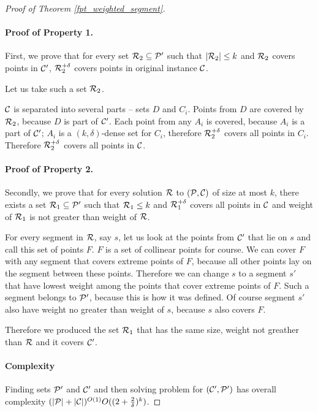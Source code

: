 \begin{proof}[Proof of Theorem \ref{fpt_weighted_segment}]
\paragraph{Proof of Property 1.}
First, we prove that
for every set $\mathcal{R}_2 \subseteq \mathcal{P}'$ such that $|\mathcal{R}_2| \le k$
and $\mathcal{R}_2$ covers points in $\mathcal{C}'$, $\mathcal{R}_2^{+\delta}$
covers points in original instance $\mathcal{C}$.

Let us take such a set $\mathcal{R}_2$.

$\mathcal{C}$ is separated into several parts -- sets $D$ and $C_i$.
Points from $D$ are covered by $\mathcal{R}_2$, because $D$ is part of $\mathcal{C}'$.
Each point from any $A_i$ is covered, because $A_i$ is a part of $\mathcal{C}'$;
$A_i$ is a $(k,\delta)$-dense set for $C_i$, therefore $\mathcal{R}_2^{+\delta}$
covers all points in $C_i$. Therefore $\mathcal{R}_2^{+\delta}$ covers
all points in $\mathcal{C}$.

\paragraph{Proof of Property 2.}
Secondly, we prove that for every solution
$\mathcal{R}$ to $(\mathcal{P}, \mathcal{C})$ of size at most $k$,
there exists a set $\mathcal{R}_1 \subseteq \mathcal{P}'$ such that
$\mathcal{R}_1 \le k$ and
$\mathcal{R}_1^{+\delta}$ covers all points in $\mathcal{C}$ and
weight of $\mathcal{R}_1$ is not greater than weight of $\mathcal{R}$.

For every segment in $\mathcal{R}$, say $s$,
let us look at the points from $\mathcal{C}'$ that lie on $s$
and call this set of points $F$.
$F$ is a set of collinear points for course.
We can cover $F$ with any segment that covers extreme points of $F$,
because all other points lay on the segment between these points.
Therefore we can change $s$ to a segment $s'$
that have lowest weight among the points that cover extreme points of $F$.
Such a segment belongs to $\mathcal{P}'$, because this is how it was defined.
Of course segment $s'$ also have weight no greater than weight of $s$,
because $s$ also covers $F$.

Therefore we produced the set $\mathcal{R}_1$ that has the same size,
weight not greather than $\mathcal{R}$ and it covers $\mathcal{C}'$.

\paragraph{Complexity}
Finding sets $\mathcal{P}'$ and $\mathcal{C}'$ and then solving 
problem for $(\mathcal{C}', \mathcal{P}')$ has overall complexity
$(|\mathcal{P}| + |\mathcal{C}|)^{O(1)}O((2 + \frac{2}{\delta})^k)$.
\end{proof}

